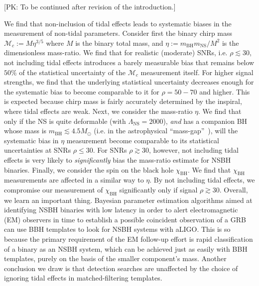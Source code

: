 \documentclass[aps,prd,amsmath,floats,floatfix, twocolumn,
superscriptaddress,nofootinbib,showpacs]{revtex4-1}
\newcommand{\prayush}{\textcolor{red!40!black}}
\newcommand{\lambdans}{\Lambda_\mathrm{NS}}
\newcommand{\chibh}{\chi_\mathrm{BH}}
\newcommand{\mbh}{m_\mathrm{BH}}
\newcommand{\mns}{m_\mathrm{NS}}
\newcommand{\mchirp}{\mathcal{M}_c}
\begin{document}
\prayush{[PK: To be continued after revision of the introduction.]}

\prayush{
We find that non-inclusion of tidal effects leads to systematic biases in
the measurement of non-tidal parameters. Consider first the binary chirp 
mass $\mchirp:=M\eta^{3/5}$ where $M$ is the binary total mass, and 
$\eta:=\mbh\mns/M^2$ is the dimensionless mass-ratio. We find that for
realistic (moderate) SNRs, i.e. $\rho\lesssim 30$, not including tidal
effects introduces a barely measurable bias that remains below $50\%$
of the statistical uncertainty of the $\mchirp$ measurement itself.
For higher signal strengths, we find that the underlying statistical
uncertainty decreases enough for the systematic bias to become comparable
to it for $\rho=50-70$ and higher. This is expected because chirp mass is fairly
accurately determined by the inspiral, where tidal effects are weak.
Next, we consider the mass-ratio $\eta$. We find that only if the NS is quite
deformable (with $\lambdans=2000$), {\it and} has a companion BH whose mass
is $\mbh\lesssim 4.5M_\odot$ (i.e. in the astrophysical ``mass-gap''~\cite{
Bailyn:1997xt,Kalogera:1996ci,Kreidberg:2012,Littenberg:2015tpa}),
will the systematic bias in $\eta$ measurement become comparable to its
statistical uncertainties at SNRs $\rho\leq 30$. For SNRs $\rho\gtrsim30$,
however, not including tidal effects is very likely to {\it significantly} bias
the mass-ratio estimate for NSBH binaries. Finally, we consider the spin on the
black hole $\chibh$. We find that $\chibh$ measurements are affected in a similar
way to $\eta$. By not including tidal effects, we compromise our measurement of
$\chibh$ significantly only if signal $\rho\gtrsim 30$. 
%
Overall, we learn an important thing. Bayesian parameter estimation algorithms
aimed at identifying NSBH binaries with low latency in order to alert 
electromagnetic (EM) observers in time to establish a possible coincident 
observation of a GRB~\cite{2012A&A...541A.155A,Singer:2014qca,Singer:2015ema,
Pankow:2015cra} can use BBH templates to look for NSBH systems with aLIGO.
This is so because the primary requirement of the EM follow-up effort is rapid
classification of a binary as an NSBH system, which can be achieved just as 
easily with BBH templates, purely on the basis of the smaller component's mass.
Another conclusion we draw is that detection searches are unaffected by the
choice of ignoring tidal effects in matched-filtering templates.
}
\end{document}
